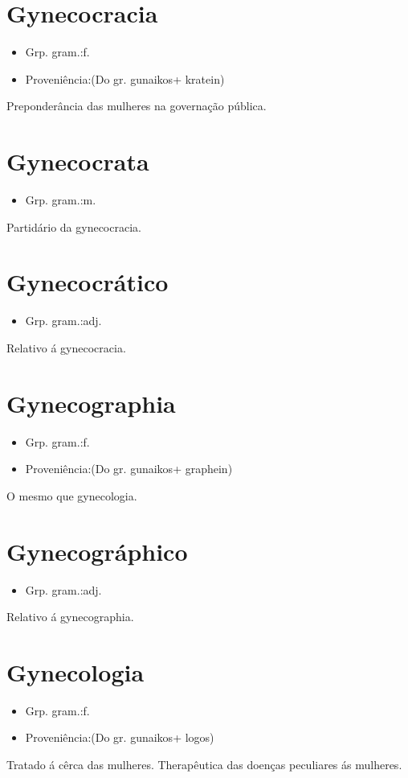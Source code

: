 \section{Gynecocracia}
\begin{itemize}
\item {Grp. gram.:f.}
\end{itemize}
\begin{itemize}
\item {Proveniência:(Do gr. \textunderscore gunaikos\textunderscore  + \textunderscore kratein\textunderscore )}
\end{itemize}
Preponderância das mulheres na governação pública.
\section{Gynecocrata}
\begin{itemize}
\item {Grp. gram.:m.}
\end{itemize}
Partidário da gynecocracia.
\section{Gynecocrático}
\begin{itemize}
\item {Grp. gram.:adj.}
\end{itemize}
Relativo á gynecocracia.
\section{Gynecographia}
\begin{itemize}
\item {Grp. gram.:f.}
\end{itemize}
\begin{itemize}
\item {Proveniência:(Do gr. \textunderscore gunaikos\textunderscore  + \textunderscore graphein\textunderscore )}
\end{itemize}
O mesmo que \textunderscore gynecologia\textunderscore .
\section{Gynecográphico}
\begin{itemize}
\item {Grp. gram.:adj.}
\end{itemize}
Relativo á gynecographia.
\section{Gynecologia}
\begin{itemize}
\item {Grp. gram.:f.}
\end{itemize}
\begin{itemize}
\item {Proveniência:(Do gr. \textunderscore gunaikos\textunderscore  + \textunderscore logos\textunderscore )}
\end{itemize}
Tratado á cêrca das mulheres.
Therapêutica das doenças peculiares ás mulheres.
